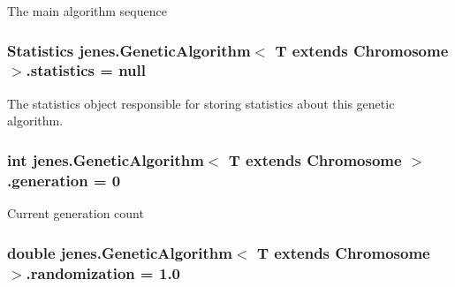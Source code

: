 The main algorithm sequence \hypertarget{classjenes_1_1_genetic_algorithm_3_01_t_01extends_01_chromosome_01_4_fc23d5cbab5434f5ec5684cda9434b93}{
\subsubsection[statistics]{\setlength{\rightskip}{0pt plus 5cm}Statistics jenes.GeneticAlgorithm$<$ T extends Chromosome $>$.{\bf statistics} = null}}
\label{classjenes_1_1_genetic_algorithm_3_01_t_01extends_01_chromosome_01_4_fc23d5cbab5434f5ec5684cda9434b93}


The statistics object responsible for storing statistics about this genetic algorithm. \hypertarget{classjenes_1_1_genetic_algorithm_3_01_t_01extends_01_chromosome_01_4_c5a1ddc5e78e2b81c754eb990a91f17b}{
\subsubsection[generation]{\setlength{\rightskip}{0pt plus 5cm}int jenes.GeneticAlgorithm$<$ T extends Chromosome $>$.{\bf generation} = 0}}
\label{classjenes_1_1_genetic_algorithm_3_01_t_01extends_01_chromosome_01_4_c5a1ddc5e78e2b81c754eb990a91f17b}


Current generation count \hypertarget{classjenes_1_1_genetic_algorithm_3_01_t_01extends_01_chromosome_01_4_dcb3e16398451c2e318de21d77b51d35}{
\subsubsection[randomization]{\setlength{\rightskip}{0pt plus 5cm}double jenes.GeneticAlgorithm$<$ T extends Chromosome $>$.{\bf randomization} = 1.0}}
\label{classjenes_1_1_genetic_algorithm_3_01_t_01extends_01_chromosome_01_4_dcb3e16398451c2e318de21d77b51d35}



